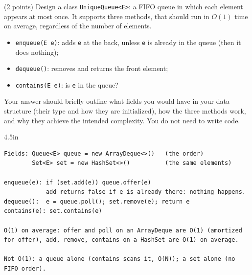 \begin{question}
(2 points) Design a class \lstinline|UniqueQueue<E>|: a FIFO queue in which each element appears at most once. It supports three methods, that should run in $O(1)$ time on average, regardless of the number of elements.
\begin{itemize}[leftmargin=2em,itemsep=1pt,topsep=2pt]
\item \lstinline|enqueue(E e)|: adds \lstinline|e| at the back, unless \lstinline|e| is already in the queue (then it does nothing);
\item \lstinline|dequeue()|: removes and returns the front element;
\item \lstinline|contains(E e)|: is \lstinline|e| in the queue?
\end{itemize}

Your answer should briefly outline what fields you would have in your data structure (their type and how they are initialized), how the three methods work, and why they achieve the intended complexity. You do not need to write code.

\begin{answerspace}{4.5in}
\ifanswers
\begin{verbatim}
Fields: Queue<E> queue = new ArrayDeque<>()   (the order)
        Set<E> set = new HashSet<>()          (the same elements)

enqueue(e): if (set.add(e)) queue.offer(e)
            add returns false if e is already there: nothing happens.
dequeue():  e = queue.poll(); set.remove(e); return e
contains(e): set.contains(e)

O(1) on average: offer and poll on an ArrayDeque are O(1) (amortized
for offer), add, remove, contains on a HashSet are O(1) on average.

Not O(1): a queue alone (contains scans it, O(N)); a set alone (no
FIFO order).
\end{verbatim}
\fi
\end{answerspace}
\end{question}
